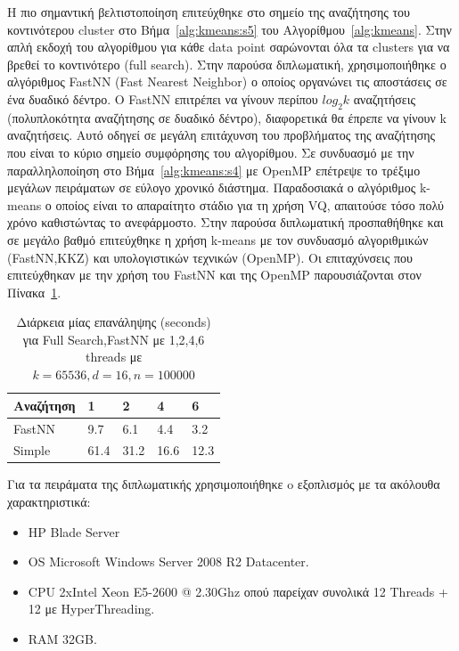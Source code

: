 \indent Η πιο σημαντική βελτιστοποίηση επιτεύχθηκε στο σημείο της αναζήτησης του κοντινότερου cluster στο
Βήμα~\ref{alg:kmeans:s5} του Αλγορίθμου~\ref{alg:kmeans}. Στην απλή εκδοχή του αλγορίθμου για κάθε data point
σαρώνονται όλα τα clusters για να βρεθεί το κοντινότερο (full search). Στην παρούσα διπλωματική, χρησιμοποιήθηκε ο αλγόριθμος
FastNN (Fast Nearest Neighbor) \cite{fastnn} ο οποίος οργανώνει τις αποστάσεις σε ένα δυαδικό δέντρο. Ο FastNN  επιτρέπει να γίνουν περίπου
$ log_{2} k $  αναζητήσεις (πολυπλοκότητα αναζήτησης σε δυαδικό δέντρο), διαφορετικά θα έπρεπε να γίνουν k αναζητήσεις.
Αυτό οδηγεί σε μεγάλη επιτάχυνση του προβλήματος της αναζήτησης που είναι το κύριο σημείο συμφόρησης του αλγορίθμου. Σε
συνδυασμό με την παραλληλοποίηση στο Βήμα~\ref{alg:kmeans:s4} με OpenMP επέτρεψε το τρέξιμο μεγάλων πειράματων σε
εύλογο χρονικό διάστημα. Παραδοσιακά ο αλγόριθμος k-means ο οποίος είναι το απαραίτητο στάδιο για τη χρήση VQ, απαιτούσε τόσο πολύ χρόνο καθιστώντας το ανεφάρμοστο. Στην παρούσα διπλωματική προσπαθήθηκε και σε μεγάλο βαθμό επιτεύχθηκε η χρήση k-means με τον συνδυασμό αλγοριθμικών (FastNN,KKZ) και υπολογιστικών τεχνικών (OpenMP). Οι επιταχύνσεις που επιτεύχθηκαν με την χρήση του FastNN και της OpenMP παρουσιάζονται
στον Πίνακα~\ref{table:fastnn}.

\begin{table}[h!]
    \begin{center}
        \begin{tabular}{| l | l | l | l | l |}
        \hline
        Αναζήτηση   & 1     & 2      & 4     & 6    \\ \hline
        FastNN      & 9.7   & 6.1    & 4.4   & 3.2  \\ \hline
        Simple      & 61.4  & 31.2   & 16.6  & 12.3    \\ \hline
        \hline
        \end{tabular}
    \end{center}
    \caption{Διάρκεια μίας επανάληψης (seconds) για Full Search,FastNN με 1,2,4,6 threads με $k=65536,d=16,n=100000$}
    \label{table:fastnn}
\end{table}

\newpage

\indent Για τα πειράματα της διπλωματικής χρησιμοποιήθηκε o εξοπλισμός με τα ακόλουθα χαρακτηριστικά:
\begin{itemize}
    \item HP Blade Server
    \item OS Microsoft Windows Server 2008 R2 Datacenter.
    \item CPU 2xIntel Xeon E5-2600 @ 2.30Ghz οπού παρείχαν συνολικά 12 Threads + 12 με HyperThreading.
    \item RAM 32GB.
\end{itemize} 
